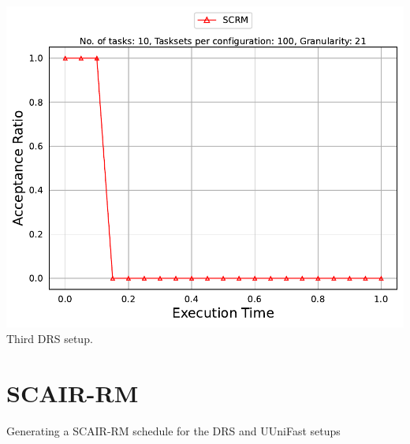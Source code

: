 \documentclass[]{article}
\begin{document}
\begin{minipage}[t]{0.48\linewidth}
            \includegraphics[width=\linewidth]{SCRM_3rd Setup.pdf}
		Third DRS setup.
		\vspace{0.3cm}


                   

	\end{minipage}

	\clearpage
	\section{SCAIR-RM}
{
\raggedleft Generating a SCAIR-RM schedule for the DRS and UUniFast setups \newline
}
\end{document}
